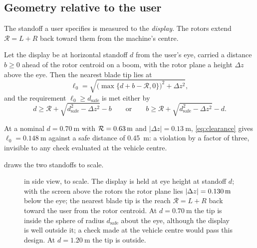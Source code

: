 \subsection{Geometry relative to the user}

The standoff a user specifies is measured to the \emph{display}. The rotors
extend $\mathcal{R}=L+R$ back toward them from the machine's centre.

\begin{proposition}
\label{prop:clearance}
Let the display be at horizontal standoff $d$ from the user's eye, carried a
distance $b\ge0$ ahead of the rotor centroid on a boom, with the rotor plane a
height $\Delta z$ above the eye. Then the nearest blade tip lies at
\begin{equation}
  \ell_0 = \sqrt{\big(\max\{d+b-\mathcal{R},0\}\big)^2 + \Delta z^2} ,
  \label{eq:clearance}
\end{equation}
and the requirement $\ell_0\ge d_{\mathrm{safe}}$ is met either by
\begin{equation}
  d \ge \mathcal{R} + \sqrt{d_{\mathrm{safe}}^2 - \Delta z^2} - b
  \qquad\text{or}\qquad
  b \ge \mathcal{R} + \sqrt{d_{\mathrm{safe}}^2-\Delta z^2} - d .
  \label{eq:clearancefix}
\end{equation}
\end{proposition}

At a nominal $d=\SI{0.70}{\metre}$ with $\mathcal{R}=\SI{0.63}{\metre}$
and $|\Delta z|=\SI{0.13}{\metre}$, \cref{eq:clearance} gives
$\ell_0=\SI{0.148}{\metre}$ against a safe distance of \SI{0.45}{\metre}: a
violation by a factor of three, invisible to any check evaluated at the
vehicle centre.

 draws the two standoffs to scale.

\begin{figure}[tbp]
\centering

\caption{ in side view, to scale. The display is held at
eye height at standoff $d$; with the screen above the rotors the rotor plane
lies $|\Delta z|=\SI{0.130}{\metre}$ below the eye; the nearest blade tip is
the reach $\mathcal{R}=L+R$ back toward the user from the rotor centroid. At
$d=\SI{0.70}{\metre}$ the tip is inside the sphere of radius $d_{\mathrm{safe}}$
about the eye, although the display is well outside it; a check made at the
vehicle centre would pass this design. At $d=\SI{1.20}{\metre}$ the tip is
outside.}
\label{fig:clearance}
\end{figure}

